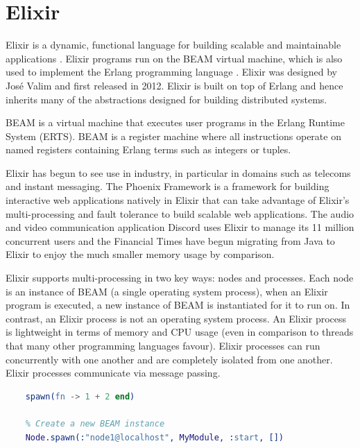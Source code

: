 \section[]{Elixir}
Elixir is a dynamic, functional language for building scalable and maintainable applications \cite{elixir}. Elixir programs run on the BEAM virtual machine\cite{beam}, which is also used to implement the Erlang programming language \cite{erlang}. Elixir was designed by José Valim and first released in 2012. Elixir is built on top of Erlang and hence inherits many of the abstractions designed for building distributed systems.
\par
BEAM is a virtual machine that executes user programs in the Erlang Runtime System (ERTS). BEAM is a register machine where all instructions operate on named registers containing Erlang terms such as integers or tuples.
\par
Elixir has begun to see use in industry, in particular in domains such as telecoms and instant messaging. The Phoenix Framework \cite{phoenix} is a framework for building interactive web applications natively in Elixir that can take advantage of Elixir's multi-processing and fault tolerance to build scalable web applications. The audio and video communication application Discord \cite{discord} uses Elixir to manage its 11 million concurrent users and the Financial Times \cite{ft} have begun migrating from Java to Elixir to enjoy the much smaller memory usage by comparison.
\par
Elixir supports multi-processing in two key ways: nodes and processes. Each node is an instance of BEAM (a single operating system process), when an Elixir program is executed, a new instance of BEAM is instantiated for it to run on. In contrast, an Elixir process is not an operating system process. An Elixir process is lightweight in terms of memory and CPU usage (even in comparison to threads that many other programming languages favour). Elixir processes can run concurrently with one another and are completely isolated from one another. Elixir processes communicate via message passing.
\begin{lstlisting}[language=Erlang, xleftmargin=.2\linewidth, caption={An example of spawn/1 and spawn/4 in Elixir for spawning a new lightweight process and a new Elixir node}]
    % Spawn a new process
    spawn(fn -> 1 + 2 end)

    % Create a new BEAM instance
    Node.spawn(:"node1@localhost", MyModule, :start, [])
\end{lstlisting}
